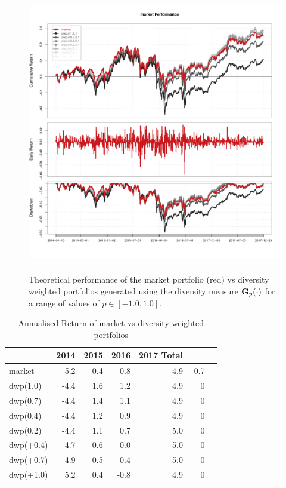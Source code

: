 \documentclass[british]{amsart} \usepackage{lmodern}
\numberwithin{equation}{section} \numberwithin{figure}{section}
\theoremstyle{plain} \newtheorem{thm}{\protect\theoremname}[section]
\theoremstyle{definition} \newtheorem{defn}[thm]{\protect\definitionname}
\theoremstyle{plain} \newtheorem{assumption}[thm]{\protect\assumptionname}
\theoremstyle{plain} \newtheorem{lem}[thm]{\protect\lemmaname}
\theoremstyle{plain} \newtheorem{prop}[thm]{\protect\propositionname}
\theoremstyle{remark} \newtheorem{rem}[thm]{\protect\remarkname}
\theoremstyle{plain} \newtheorem{cor}[thm]{\protect\corollaryname}
\begin{document}
\begin{figure}[!ht]
  \label{fig:figsimpleperformance}
  \caption{Theoretical performance of the market portfolio (red) vs diversity weighted
portfolios generated using the diversity measure $\mathbf{G}_{p}(\cdot)$ for a range of
  values of $p \in [-1.0, 1.0]$.}
  \includegraphics[width=400pt,height=350pt]{performance.pdf}
\end{figure}

\begin{table}[!ht]
  \caption{Annualised Return of market vs diversity weighted portfolios}
  \begin{tabular}{lrrrrrr}
    \toprule
    \bf  & \bf 2014 & \bf 2015 & \bf 2016 & \bf 2017 \bf Total \\
    \midrule
    market & \color{red}5.2 & 0.4 & \color{red}-0.8 & 4.9 & \color{red}-0.7 \\
    dwp(1.0) & \color{red}-4.4 & 1.6 & 1.2 & 4.9 & 0\\
    dwp(0.7) & \color{red}-4.4 & 1.4 & 1.1 & 4.9 & 0\\
    dwp(0.4) & \color{red}-4.4 & 1.2 & 0.9 & 4.9 & 0\\
    dwp(0.2) & \color{red}-4.4 & 1.1 & 0.7 & 5.0 & 0\\
    dwp(+0.4) & \color{red}4.7 & 0.6 & 0.0 & 5.0 & 0\\
    dwp(+0.7) & \color{red}4.9 & 0.5 & \color{red}-0.4 & 5.0 & 0\\
    dwp(+1.0) & \color{red}5.2 & 0.4 & \color{red}-0.8 & 4.9 & 0\\
    \bottomrule
  \end{tabular}
\end{table}
\end{document}
